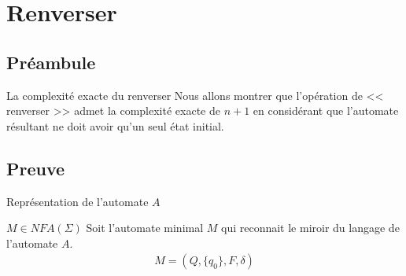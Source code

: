 
\section{Renverser}


\subsection{Préambule}

\begin{frame}{\myframetitle}
  \begin{block}{La complexité exacte du renverser}
    Nous allons montrer que l'opération de << renverser >> admet la complexité
    exacte de \(n + 1\) en considérant que l'automate résultant ne doit avoir
    qu'un seul état initial.
  \end{block}
\end{frame}

\subsection{Preuve}

\begin{frame}{\myframetitle}
  \begin{block}{Représentation de l'automate \(A\)}
    \centering
  \end{block}

  \pause[]

  \begin{block}{\(M \in NFA(\Sigma)\)}
    Soit l'automate minimal \(M\) qui reconnait le miroir du langage de
    l'automate \(A\).
    \begin{gather*}
      M = (Q, \{q_0\}, F, \delta)
    \end{gather*}
  \end{block}
\end{frame}

